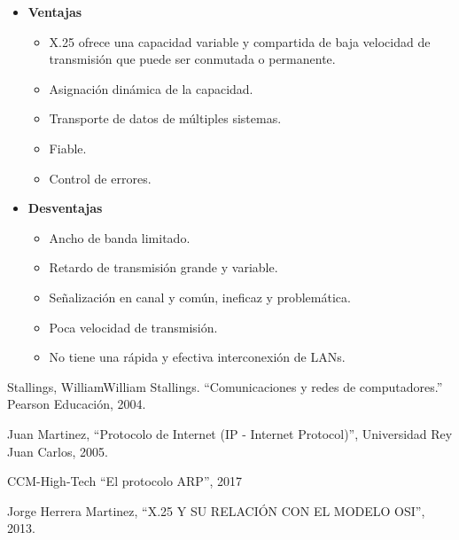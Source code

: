 \documentclass[a4paper,12pt]{article}
\begin{document}
\begin{itemize}
 \item \textbf{Ventajas}
 
 \begin{itemize}
  \item X.25 ofrece una capacidad variable y compartida de baja velocidad de transmisión que puede ser conmutada o permanente.
  \item Asignación dinámica de la capacidad.
  \item Transporte de datos de múltiples sistemas.
  \item Fiable.
  \item Control de errores.
 \end{itemize}

 \item \textbf{Desventajas}
 
 \begin{itemize}
  \item Ancho de banda limitado.
  \item Retardo de transmisión grande y variable.
  \item Señalización en canal y común, ineficaz y problemática.
  \item Poca velocidad de transmisión.
  \item No tiene una rápida y efectiva interconexión de LANs.
 \end{itemize}

 
 
\end{itemize}



\begin{thebibliography}{1}
 Stallings, WilliamWilliam Stallings. ``Comunicaciones y redes de computadores.'' Pearson Educación, 2004.
 
 Juan Martinez, ``Protocolo de Internet (IP - Internet Protocol)'', Universidad Rey Juan Carlos, 2005.
 
 CCM-High-Tech ``El protocolo ARP'', 2017
 
 Jorge Herrera Martinez, ``X.25 Y SU RELACIÓN CON EL MODELO OSI'', 2013.
 
 
\end{thebibliography}
\end{document}
